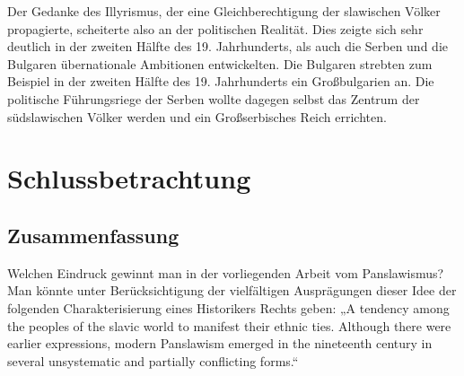 \documentclass[12pt,headsepline,a4paper]{scrartcl}
\begin{document}
Der Gedanke des Illyrismus, der eine Gleichberechtigung der slawischen Völker propagierte,
scheiterte also an der politischen Realität. Dies zeigte sich sehr deutlich in der zweiten Hälfte
des 19. Jahrhunderts, als auch die Serben und die Bulgaren übernationale Ambitionen
entwickelten. Die Bulgaren strebten zum Beispiel in der zweiten Hälfte des 19. Jahrhunderts
ein Großbulgarien an. Die politische Führungsriege der Serben wollte dagegen selbst das
Zentrum der südslawischen Völker werden und ein Großserbisches Reich errichten.\autocite[84]{shidak}
\newpage
\section*{Schlussbetrachtung}
\subsection*{Zusammenfassung}
Welchen Eindruck gewinnt man in der vorliegenden Arbeit vom Panslawismus? Man könnte
unter Berücksichtigung der vielfältigen Ausprägungen dieser Idee der folgenden
Charakterisierung eines Historikers Rechts geben: „A tendency among the peoples of the
slavic world to manifest their ethnic ties. Although there were earlier expressions, modern
Panslawism emerged in the nineteenth century in several unsystematic and partially
conflicting forms.“\autocite[232]{nicoll}
\end{document}
